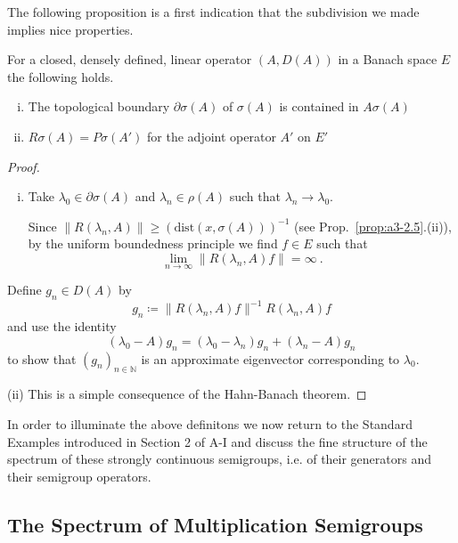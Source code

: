 The following proposition is a first indication that the subdivision we made implies nice properties.
\begin{proposition}\label{prop:a3-3.6}
For a closed, densely defined, linear operator $(A,D(A))$ in a Banach space $E$ the following holds.
\begin{enumerate}[(i)]

\item 
The topological boundary $\partial\sigma(A)$ of $\sigma(A)$ is contained in $A\sigma(A)$
			
\item 
$R\sigma(A) = P\sigma(A')$ for the adjoint operator $A'$ on $E'$

\end{enumerate}
\end{proposition}
\begin{proof}
		\begin{enumerate}[(i)]
			\item Take $\lambda_{0} \in \partial\sigma(A)$ and $\lambda_{n} \in \rho(A)$ such that $\lambda_{n} \to \lambda_{0}$.
			
			Since $\|R(\lambda_{n},A)\| \geq (\text{dist}(x,\sigma(A)))^{-1}$ (see Prop.~\ref{prop:a3-2.5}.(ii)), by the uniform boundedness principle we find $f \in E$ such that 
\[
\lim_{n \to \infty}\|R(\lambda_n ,A)f\| = \infty~.
\]
\end{enumerate}
%
%
%
Define $g_{n} \in D(A)$ by
\[
g_{n} \coloneqq \|R(\lambda_{n},A)f\|^{-1} R(\lambda_{n},A)f
\]
and use the identity
\[
(\lambda_{0} - A)g_{n} = (\lambda_{0} - \lambda_{n})g_{n} + (\lambda_{n} - A)g_{n}
\]
to show that $(g_{n})_{n \in \mathbb{N}}$ is an approximate eigenvector corresponding to $\lambda_{0}$.

(ii) This is a simple consequence of the Hahn-Banach theorem.
\end{proof}

In order to illuminate the above definitons we now return to the Standard Examples introduced in Section 2 of A-I and discuss the fine structure of the spectrum of these strongly continuous semigroups, i.e. of their generators and their semigroup operators.

\subsection{The Spectrum of Multiplication Semigroups}\label{subsec:a3-2.3}

